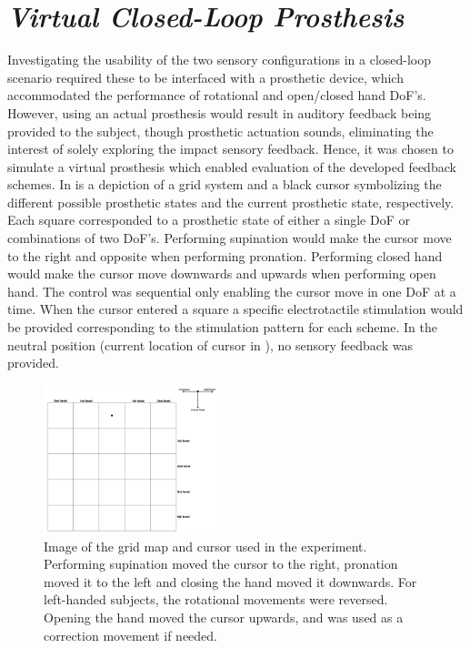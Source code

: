 

\section{\textit{Virtual Closed-Loop Prosthesis}}

Investigating the usability of the two sensory configurations in a closed-loop scenario required these to be interfaced with a prosthetic device, which accommodated the performance of rotational and open/closed hand DoF's. However, using an actual prosthesis would result in auditory feedback being provided to the subject, though prosthetic actuation sounds, eliminating the interest of solely exploring the impact sensory feedback. Hence, it was chosen to simulate a virtual prosthesis which enabled evaluation of the developed feedback schemes. In  is a depiction of a grid system and a black cursor symbolizing the different possible prosthetic states and the current prosthetic state, respectively. Each square corresponded to a prosthetic state of either a single DoF or combinations of two DoF's. Performing supination would make the cursor move to the right and opposite when performing pronation. Performing closed hand would make the cursor move downwards and upwards when performing open hand. The control was sequential only enabling the cursor move in one DoF at a time. When the cursor entered a square a specific electrotactile stimulation would be provided corresponding to the stimulation pattern for each scheme. In the neutral position (current location of cursor in ), no sensory feedback was provided.     

\begin{figure}[H]                 
	\includegraphics[width=0.45\textwidth]{figures/gridmap2}  
	\caption{Image of the grid map and cursor used in the experiment. Performing supination moved the cursor to the right, pronation moved it to the left and closing the hand moved it downwards. For left-handed subjects, the rotational movements were reversed. Opening the hand moved the cursor upwards, and was used as a correction movement if needed.}
	\label{fig:meth:gridmap} 
\end{figure}